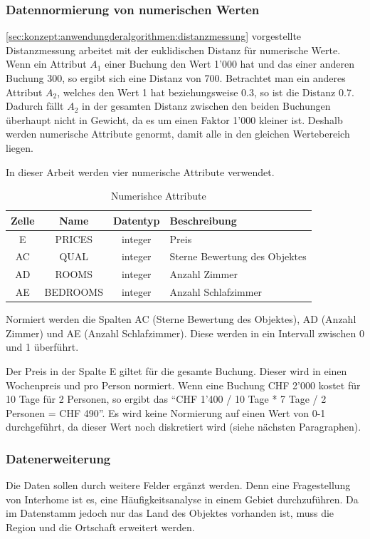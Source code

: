 \subsubsection{Datennormierung von numerischen Werten} 
\label{sec:recherche:datenvorbereitung:normierung} \cref{sec:konzept:anwendungderalgorithmen:distanzmessung} vorgestellte Distanzmessung arbeitet mit der euklidischen Distanz für numerische Werte. Wenn ein Attribut $A_1$ einer Buchung den Wert 1'000 hat und das einer anderen Buchung 300, so ergibt sich eine Distanz von 700. Betrachtet man ein anderes Attribut $A_2$, welches den Wert 1 hat beziehungsweise 0.3, so ist die Distanz 0.7. Dadurch fällt $A_2$ in der gesamten Distanz zwischen den beiden Buchungen überhaupt nicht in Gewicht, da es um einen Faktor 1'000 kleiner ist. Deshalb werden numerische Attribute genormt, damit alle in den gleichen Wertebereich liegen.

In dieser Arbeit werden vier numerische Attribute verwendet.
\begin{table}[H] 
	\caption{Numerishce Attribute}
	\centering
	\label{fig:recherche:datenvorbereitung:5}
	\begin{tabular}{ | c | c | c | l | } 
		\hline 
		\rowcolor{tableheadcolor}
		\bfseries Zelle & \bfseries Name & \bfseries Datentyp & \bfseries Beschreibung \\ \hline 
		E & PRICES & integer & Preis \\ \hline 
		AC & QUAL & integer & Sterne Bewertung des Objektes \\ \hline 
		AD & ROOMS & integer & Anzahl Zimmer \\ \hline 
		AE & BEDROOMS & integer & Anzahl Schlafzimmer \\ \hline 
	\end{tabular}
\end{table}

Normiert werden die Spalten AC (Sterne Bewertung des Objektes), AD (Anzahl Zimmer) und AE (Anzahl Schlafzimmer). Diese werden in ein Intervall zwischen 0 und 1 überführt.

Der Preis in der Spalte E giltet für die gesamte Buchung. Dieser wird in einen Wochenpreis und pro Person normiert. Wenn eine Buchung CHF 2'000 kostet für 10 Tage für 2 Personen, so ergibt das "`CHF 1'400 / 10 Tage * 7 Tage / 2 Personen = CHF 490"'. Es wird keine Normierung auf einen Wert von 0-1 durchgeführt, da dieser Wert noch diskretiert wird (siehe nächsten Paragraphen).

\subsubsection{Datenerweiterung} 
Die Daten sollen durch weitere Felder ergänzt werden. Denn eine Fragestellung von Interhome ist es, eine Häufigkeitsanalyse in einem Gebiet durchzuführen. Da im Datenstamm jedoch nur das Land des Objektes vorhanden ist, muss die Region und die Ortschaft erweitert werden. 

